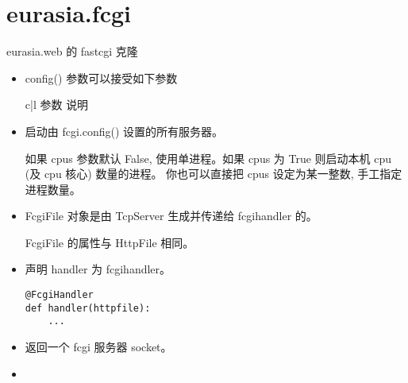 \documentclass{manual}
\begin{document}
\section{eurasia.fcgi}

eurasia.web 的 fastcgi 克隆

\begin{itemize}

\item {}

config() 参数可以接受如下参数

\begin{tableii}{c|l}{}{ 参数 }{ 说明 }
\end{tableii}


\item {}

启动由 fcgi.config() 设置的所有服务器。

如果 cpus 参数默认 False, 使用单进程。如果 cpus 为 True 则启动本机 cpu (及 cpu 核心) 数量的进程。
你也可以直接把 cpus 设定为某一整数, 手工指定进程数量。


\item {}

FcgiFile 对象是由 TcpServer 生成并传递给 fcgihandler 的。

FcgiFile 的属性与 HttpFile 相同。


\item {}

声明 handler 为 fcgihandler。

\begin{verbatim}
@FcgiHandler
def handler(httpfile):
	...
\end{verbatim}

\item {}

返回一个 fcgi 服务器 socket。

\item {}


\end{itemize}
\end{document}
